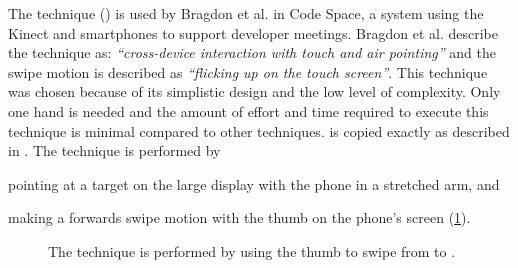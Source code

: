 The \swipe technique () is used by Bragdon et al. \cite{Bragdon:2011} in Code Space, a system using the Kinect and smartphones to support developer meetings. 
Bragdon et al. describe the technique as: \emph{``cross-device interaction with touch and air pointing''} and the swipe motion is described as \emph{``flicking up on the touch screen''}. 
This technique was chosen because of its simplistic design and the low level of complexity.
Only one hand is needed and the amount of effort and time required to execute this technique is minimal compared to other techniques.
\swipe is copied exactly as described in \cite{Bragdon:2011}.
The \swipe technique is performed by 
\begin{enumerate*}[label=\itshape\roman*\upshape)]
	\item{pointing at a target on the large display with the phone in a stretched arm, and}
	\item{making a forwards swipe motion with the thumb on the phone's screen (\cref{fig:swipeTechnique}).}
\end{enumerate*}

\begin{figure}[H]
\caption{The \swipe technique is performed by using the thumb to swipe from \protect{} to \protect{}.}
\label{fig:swipeTechnique}
\end{figure}

